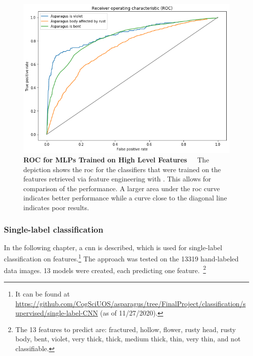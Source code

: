 \begin{figure}[!htb]
    \centering
    \includegraphics[scale=0.6]{Figures/chapter04/fe_roc.png}
    \caption[Feature Engineering ROC Curve]{\textbf{ROC for MLPs Trained on High Level Features}~~~The depiction shows the \acrfull{roc} for the classifiers that were trained on the features retrieved via feature engineering with . This allows for comparison of the performance. A larger area under the \acrshort{roc} curve indicates better performance while a curve close to the diagonal line indicates poor results.}
    \label{fig:FeatureEngineeringROC}
\end{figure}


\subsubsection{Single-label classification}
\label{subsec:SingleLabel}

In the following chapter, a \acrlong{cnn} is described, which is used for single-label classification on features.\footnote{It can be found at \url{https://github.com/CogSciUOS/asparagus/tree/FinalProject/classification/supervised/single-label-CNN} (as of 11/27/2020).} The approach was tested on the 13319 hand-labeled data images. 13 models were created, each predicting one feature.~\footnote{The 13 features to predict are: fractured, hollow, flower, rusty head, rusty body, bent, violet, very thick, thick, medium thick, thin, very thin, and not classifiable.}

